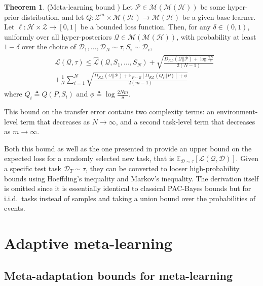 \documentclass{article} %
\theoremstyle{definition}
\newtheorem{theorem}{Theorem}[section]
\newcommand{\Expect}[2]{\mathbb{E}_{#1}\left [#2 \right ]}
\begin{document}
\begin{theorem} (Meta-learning bound \citep{Amit2018}) \label{thm:meta-pb}
	Let $\mathcal{P}\in \mathcal{M}(\mathcal{M}(\mathcal{H}))$ be some hyper-prior distribution, and let $Q: \mathcal{Z}^m\times\mathcal{M}(\mathcal{H})\rightarrow \mathcal{M}(\mathcal{H})$ be a given base learner. Let $\ell: \mathcal{H}\times \mathcal{Z}\rightarrow [0, 1]$ be a bounded loss function.
	Then, for any $\delta \in (0,1)$, uniformly over all hyper-posteriors $\mathcal{Q}\in \mathcal{M}(\mathcal{M}(\mathcal{H}))$, with probability at least $1-\delta$ over the choice of $\mathcal{D}_1,...,\mathcal{D}_N\sim \tau, S_i\sim \mathcal{D}_i$, 
%	
	\begin{align*} 
	\begin{split}
	&\mathcal{L}(\mathcal{Q}, \tau) \leq \hat{\mathcal{L}}(\mathcal{Q}, S_1,...,S_N) 
	+\sqrt{\frac{D_{KL}(\mathcal{Q}||\mathcal{P})+\log\frac{2N}{\delta}}{2(N-1)}} \\
	&+\frac{1}{N}\sum_{i=1}^{N}\sqrt{\frac{D_{KL}(\mathcal{Q}||\mathcal{P})+\Expect{P\sim \mathcal{Q}}{D_{KL}(Q_i||P)}+\phi}{2(m-1)}}
	\end{split}
	\end{align*}
	where $Q_i\triangleq Q(P,S_i)$ and $\phi\triangleq \log\frac{2Nm}{\delta}$.
\end{theorem}

This bound on the transfer error contains two complexity terms: an environment-level term that decreases as $N\rightarrow \infty$, and a second task-level term that decreases as $m\rightarrow \infty$. 

Both this bound as well as the one presented in \cite{Rothfuss2020} provide an upper bound on the expected loss for a randomly selected new task, that is
$\Expect{\mathcal{D}\sim \tau}{\mathcal{L}(\mathcal{Q}, \mathcal{D})}$.
Given a specific test task $\mathcal{D}_T\sim \tau$, they can be converted to looser high-probability bounds using Hoeffding's inequality and Markov's inequality. The derivation itself is omitted since it is essentially identical to classical PAC-Bayes bounds but for i.i.d.\ tasks instead of samples and taking a union bound over the probabilities of events.

\section{Adaptive meta-learning}

\subsection{Meta-adaptation bounds for meta-learning} \label{sec:adapt-general}
\end{document}
